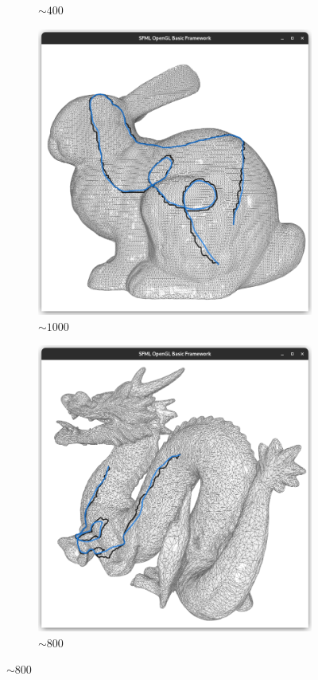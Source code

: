 \documentclass{stdlocal}
\begin{document}
\begin{figure}
\begin{subfigure}[b]{0.24\linewidth}
    \caption{$\sim 400$}
  \end{subfigure}
  \begin{subfigure}[b]{0.24\linewidth}
    \centering
    \includegraphics[width=\linewidth,trim={15px 20 15 50},clip]{images/bunny-smooth-0.95.png}
    \caption{$\sim 1000$}
  \end{subfigure}
  \begin{subfigure}[b]{0.24\linewidth}
    \centering
    \includegraphics[width=\linewidth,trim={15px 20 15 50},clip]{images/dragon-smooth-0.95.png}
    \caption{$\sim 800$}
  \end{subfigure}


\end{figure}
\end{document}

